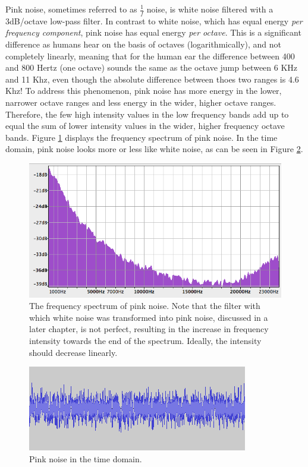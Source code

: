 \documentclass[12pt,twoside]{report}
\begin{document}
Pink noise, sometimes referred to as $\frac{1}{f}$ noise, is white noise filtered with a 3dB/octave low-pass filter. In contrast to white noise, which has equal energy \emph{per frequency component}, pink noise has equal energy \emph{per octave}. This is a significant difference as humans hear on the basis of octaves (logarithmically), and not completely linearly, meaning that for the human ear the difference between 400 and 800 Hertz (one octave) sounds the same as the octave jump between 6 KHz and 11 Khz, even though the absolute difference between thoes two ranges is 4.6 Khz! To address this phenomenon, pink noise has more energy in the lower, narrower octave ranges and less energy in the wider, higher octave ranges. Therefore, the few high intensity values in the low frequency bands add up to equal the sum of lower intensity values in the wider, higher frequency octave bands. Figure \ref{fig:pnoisef} displays the frequency spectrum of pink noise. In the time domain, pink noise looks more or less like white noise, as can be seen in Figure \ref{fig:pnoiset}.

\begin{figure}[t!]
  \includegraphics[scale=0.6]{img/pnoisef}
  \caption{The frequency spectrum of pink noise. Note that the filter with which white noise was transformed into pink noise, discussed in a later chapter, is not perfect, resulting in the increase in frequency intensity towards the end of the spectrum. Ideally, the intensity should decrease linearly.}
  \label{fig:pnoisef}
\end{figure}

\begin{figure}[t!]
  \includegraphics[scale=0.7]{img/pnoiset}
  \caption{Pink noise in the time domain.}
  \label{fig:pnoiset}
\end{figure}
\end{document}
